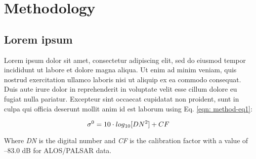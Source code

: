 
\chapter{Methodology}
\label{cha: methodology}

\section{Lorem ipsum}
\label{sec: method-lorem-ipsum}

Lorem ipsum dolor sit amet, consectetur adipiscing elit, sed do eiusmod tempor incididunt ut labore et dolore magna aliqua. Ut enim ad minim veniam, quis nostrud exercitation ullamco laboris nisi ut aliquip ex ea commodo consequat. Duis aute irure dolor in reprehenderit in voluptate velit esse cillum dolore eu fugiat nulla pariatur. Excepteur sint occaecat cupidatat non proident, sunt in culpa qui officia deserunt mollit anim id est laborum using Eq. \ref{eqn: method-eq1}:

\begin{equation} \label{eqn: method-eq1}
		\sigma^0=10\cdot log\textsubscript{10}[DN^2]+CF
\end{equation}

\noindent Where \textit{DN} is the digital number and \textit{CF} is the calibration factor with a value of –83.0 dB for ALOS/PALSAR data.
